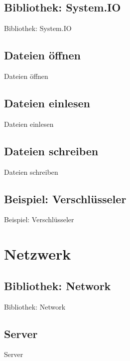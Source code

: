 \documentclass{beamer}
\begin{document}
\subsection{Bibliothek: System.IO}
\begin{frame}{Bibliothek: System.IO}
\begin{itemize}
\end{itemize}
\end{frame}

\subsection{Dateien \"offnen}
\begin{frame}{Dateien \"offnen}
\end{frame}

\subsection{Dateien einlesen}
\begin{frame}{Dateien einlesen}
\end{frame}

\subsection{Dateien schreiben}
\begin{frame}{Dateien schreiben}
\end{frame}

\subsection{Beispiel: Verschl\"usseler}
\begin{frame}{Beispiel: Verschl\"usseler}
\end{frame}

\section{Netzwerk}
\subsection{Bibliothek: Network}
\begin{frame}{Bibliothek: Network}
\end{frame}

\subsection{Server}
\begin{frame}{Server}
\end{frame}
\end{document}
